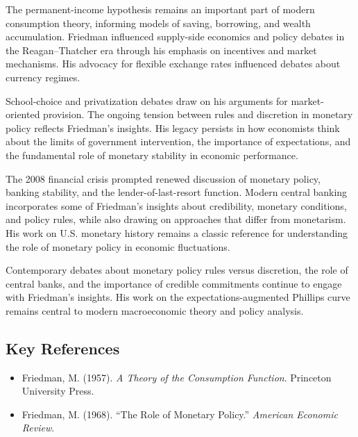 The permanent-income hypothesis remains an important part of modern consumption theory, informing
models of saving, borrowing, and wealth accumulation. Friedman influenced supply-side economics
and policy debates in the Reagan--Thatcher era through his emphasis on incentives and market
mechanisms. His advocacy for flexible exchange rates influenced debates about currency regimes.

School-choice and privatization debates draw on his arguments for market-oriented provision. The
ongoing tension between rules and discretion in monetary policy reflects Friedman's insights.
His legacy persists in how economists think about the limits of government intervention, the
importance of expectations, and the fundamental role of monetary stability in economic performance.

The 2008 financial crisis prompted renewed discussion of monetary policy, banking stability, and
the lender-of-last-resort function. Modern central banking incorporates some of Friedman's
insights about credibility, monetary conditions, and policy rules, while also drawing on approaches
that differ from monetarism. His work on U.S. monetary history remains a classic reference for
understanding the role of monetary policy in economic fluctuations.

Contemporary debates about monetary policy rules versus discretion, the role of central banks,
and the importance of credible commitments continue to engage with Friedman's insights. His
work on the expectations-augmented Phillips curve remains central to modern macroeconomic theory
and policy analysis.

\subsection*{Key References}
\begin{itemize}
    \item Friedman, M. (1957). \textit{A Theory of the Consumption Function}. Princeton University Press.
    \item Friedman, M. (1968). ``The Role of Monetary Policy.''
    \textit{American Economic Review}.
\end{itemize}

